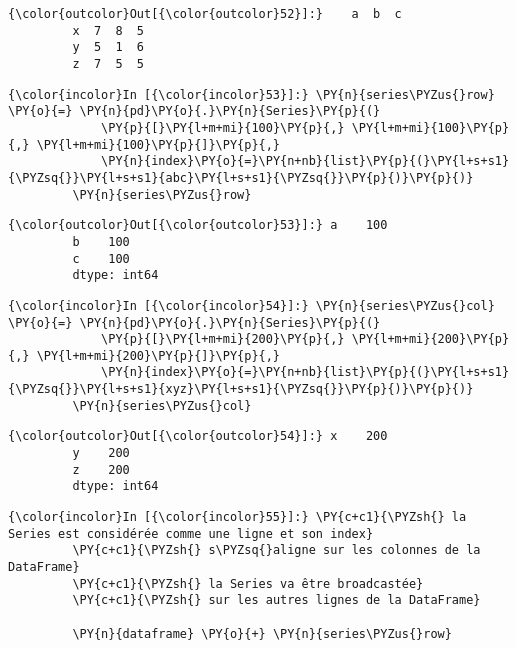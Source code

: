 \begin{Verbatim}[commandchars=\\\{\},frame=single,framerule=0.3mm,rulecolor=\color{cellframecolor}]
{\color{outcolor}Out[{\color{outcolor}52}]:}    a  b  c
         x  7  8  5
         y  5  1  6
         z  7  5  5
\end{Verbatim}
            
    \begin{Verbatim}[commandchars=\\\{\},frame=single,framerule=0.3mm,rulecolor=\color{cellframecolor}]
{\color{incolor}In [{\color{incolor}53}]:} \PY{n}{series\PYZus{}row} \PY{o}{=} \PY{n}{pd}\PY{o}{.}\PY{n}{Series}\PY{p}{(}
             \PY{p}{[}\PY{l+m+mi}{100}\PY{p}{,} \PY{l+m+mi}{100}\PY{p}{,} \PY{l+m+mi}{100}\PY{p}{]}\PY{p}{,}
             \PY{n}{index}\PY{o}{=}\PY{n+nb}{list}\PY{p}{(}\PY{l+s+s1}{\PYZsq{}}\PY{l+s+s1}{abc}\PY{l+s+s1}{\PYZsq{}}\PY{p}{)}\PY{p}{)}
         \PY{n}{series\PYZus{}row}
\end{Verbatim}


\begin{Verbatim}[commandchars=\\\{\},frame=single,framerule=0.3mm,rulecolor=\color{cellframecolor}]
{\color{outcolor}Out[{\color{outcolor}53}]:} a    100
         b    100
         c    100
         dtype: int64
\end{Verbatim}
            
    \begin{Verbatim}[commandchars=\\\{\},frame=single,framerule=0.3mm,rulecolor=\color{cellframecolor}]
{\color{incolor}In [{\color{incolor}54}]:} \PY{n}{series\PYZus{}col} \PY{o}{=} \PY{n}{pd}\PY{o}{.}\PY{n}{Series}\PY{p}{(}
             \PY{p}{[}\PY{l+m+mi}{200}\PY{p}{,} \PY{l+m+mi}{200}\PY{p}{,} \PY{l+m+mi}{200}\PY{p}{]}\PY{p}{,}
             \PY{n}{index}\PY{o}{=}\PY{n+nb}{list}\PY{p}{(}\PY{l+s+s1}{\PYZsq{}}\PY{l+s+s1}{xyz}\PY{l+s+s1}{\PYZsq{}}\PY{p}{)}\PY{p}{)}
         \PY{n}{series\PYZus{}col}
\end{Verbatim}


\begin{Verbatim}[commandchars=\\\{\},frame=single,framerule=0.3mm,rulecolor=\color{cellframecolor}]
{\color{outcolor}Out[{\color{outcolor}54}]:} x    200
         y    200
         z    200
         dtype: int64
\end{Verbatim}
            
    \begin{Verbatim}[commandchars=\\\{\},frame=single,framerule=0.3mm,rulecolor=\color{cellframecolor}]
{\color{incolor}In [{\color{incolor}55}]:} \PY{c+c1}{\PYZsh{} la Series est considérée comme une ligne et son index}
         \PY{c+c1}{\PYZsh{} s\PYZsq{}aligne sur les colonnes de la DataFrame}
         \PY{c+c1}{\PYZsh{} la Series va être broadcastée}
         \PY{c+c1}{\PYZsh{} sur les autres lignes de la DataFrame}
         
         \PY{n}{dataframe} \PY{o}{+} \PY{n}{series\PYZus{}row}
\end{Verbatim}



